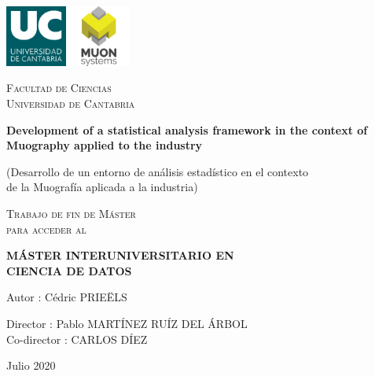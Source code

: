 \documentclass[a4paper, 11pt, twoside, openright]{report}
\begin{document}

\begin{titlepage}

	\centering
	\includegraphics[width=0.15\textwidth]{figs/image_UC.png} \hspace{20pt} \includegraphics[width=0.15\textwidth]{figs/muonSystems.png} \par\vspace{1cm}
	{\scshape\LARGE Facultad de Ciencias \\ Universidad de Cantabria \par}
	
	\vspace{1.5cm}
	
	{\huge\bfseries Development of a statistical analysis framework in the context of Muography applied to the industry}
	
	\vspace{0.6cm}
		
	{\LARGE (Desarrollo de un entorno de an\'alisis estad\'istico en el contexto \\ de la Muograf\'ia aplicada a la industria) \par}
	
	\vspace{2.6cm}
	{\scshape\Large Trabajo de fin de M\'aster \\ para acceder al \par}
	\vspace{0.3cm}
	{\scshape\Large \textbf{M\'ASTER INTERUNIVERSITARIO EN \\ CIENCIA DE DATOS} \par}
	
	\begin{flushright}
	
	\vspace{2.6cm}
	{\Large Autor : C\'edric PRIE\"ELS\par}
	{\Large Director : Pablo MART\'INEZ RU\'IZ DEL \'ARBOL\\}
	{\Large Co-director : CARLOS D\'IEZ\\}
	\vspace{0.5cm}
	{\Large Julio 2020\par}
	\vfill
	
	\end{flushright}

\end{titlepage}
\end{document}
